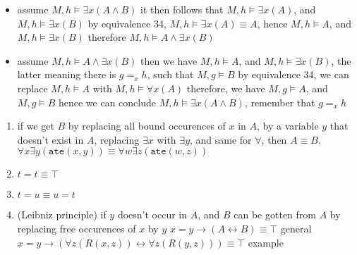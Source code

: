 \documentclass[a4paper, 12pt]{article}
\begin{document}
                \begin{itemize}
                    \itemsep0em
                    \item assume $M, h \vDash \exists x (A \land B)$
                        \subitem it then follows that $M, h \vDash \exists x (A)$, and $M, h \vDash \exists x (B)$
                        \subitem by equivalence 34, $M, h \vDash \exists x (A) \equiv A$, hence $M, h \vDash A$, and $M, h \vDash \exists x (B)$
                        \subitem therefore $M, h \vDash A \land \exists x (B)$
                    \item assume $M, h \vDash A \land \exists x (B)$
                        \subitem then we have $M, h \vDash A$, and $M, h \vDash \exists x (B)$, the latter meaning there is $g =_x h$, such that $M, g \vDash B$
                        \subitem by equivalence 34, we can replace $M, h \vDash A$ with $M, h \vDash \forall x (A)$
                        \subitem therefore, we have $M, g \vDash A$, and $M, g \vDash B$
                        \subitem hence we can conclude $M, h \vDash \exists x (A \land B)$, remember that $g =_x h$
                \end{itemize}
                \begin{enumerate}[1.]
                    \itemsep0em
                    \setcounter{enumi}{37}
                    \item if we get $B$ by replacing all bound occurences of $x$ in $A$, by a variable $y$ that doesn't exist in $A$, replacing $\exists x$ with $\exists y$, and same for $\forall$, then $A \equiv B$. \hfill $\forall x \exists y (\texttt{ate}(x, y)) \equiv \forall w \exists z (\texttt{ate}(w, z))$
                    \item $t = t \equiv \top$
                    \item $t = u \equiv u = t$
                    \item (Leibniz principle) if $y$ doesn't occur in $A$, and $B$ can be gotten from $A$ by replacing free occurences of $x$ by $y$
                        \subitem $x = y \rightarrow (A \leftrightarrow B) \equiv \top$ \hfill general
                        \subitem $x = y \rightarrow (\forall z (R(x, z)) \leftrightarrow \forall z (R(y, z))) \equiv \top$ \hfill example
                \end{enumerate}
\end{document}
